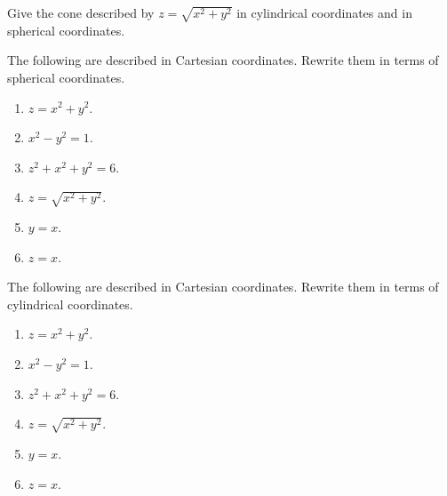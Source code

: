 \begin{ex} Give the cone described by $z=\sqrt{x^{2}+y^{2}}$ in cylindrical coordinates and
in spherical coordinates.
\end{ex}

\begin{ex} The following are described in Cartesian coordinates. Rewrite them in terms of spherical coordinates.

\begin{enumerate}
\item $z=x^{2}+y^{2}$.

\item $x^{2}-y^{2}=1$.

\item $z^{2}+x^{2}+y^{2}=6$.

\item $z=\sqrt{x^{2}+y^{2}}$.

\item $y=x$.

\item $z=x$.
\end{enumerate}
\end{ex}

\begin{ex} The following are described in Cartesian coordinates. Rewrite them in terms of cylindrical coordinates.

\begin{enumerate}
\item $z=x^{2}+y^{2}$.

\item $x^{2}-y^{2}=1$.

\item $z^{2}+x^{2}+y^{2}=6$.

\item $z=\sqrt{x^{2}+y^{2}}$.

\item $y=x$.

\item $z=x$.
\end{enumerate}
\end{ex}

